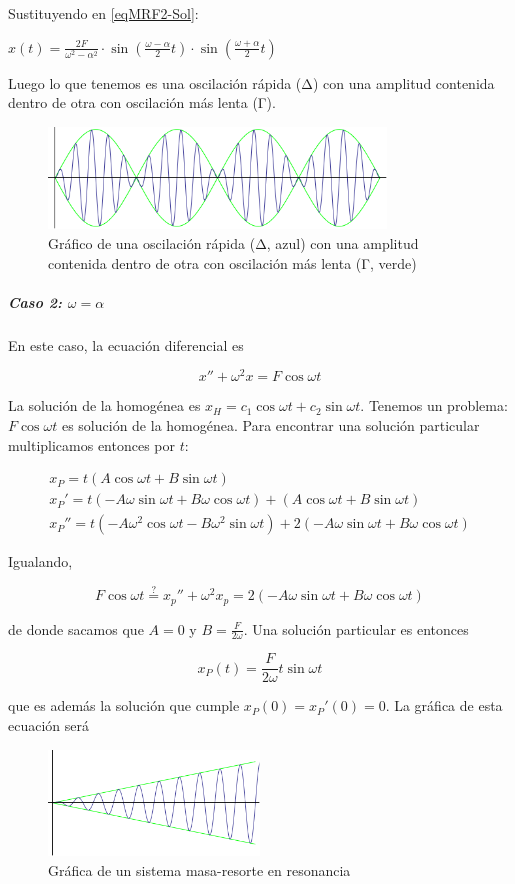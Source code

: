 Sustituyendo en \eqref{eqMRF2-Sol}:

\( x(t) = \frac{2F}{ω^2-α^2} ·\sin\left( \frac{ω-α}{2}t\right) · \sin\left( \frac{ω+α}{2}t\right)  \)

Luego lo que tenemos es una oscilación rápida (Δ) con una amplitud contenida dentro de otra con oscilación más lenta (Γ).

\begin{figure}
\centering
\includegraphics[width=0.8\textwidth]{img/MasaResorteF.png}
\caption{Gráfico de una oscilación rápida (Δ, azul) con una amplitud contenida dentro de otra con oscilación más lenta (Γ, verde)}
\label{imgMasaResorteF}
\end{figure}

\subparagraph{Caso 2: $ω=α$}

En este caso, la ecuación diferencial es

\[ x'' + ω^2 x = F\cos ωt \]

La solución de la homogénea es $x_H = c_1 \cos ωt + c_2 \sin ωt$. Tenemos un problema: $F\cos ωt$ es solución de la homogénea. Para encontrar una solución particular multiplicamos entonces por $t$:

\begin{gather*}
x_P = t\left(A\cos ωt + B\sin ωt\right) \\
x_P' =t\left(-Aω\sin ωt + Bω\cos ωt\right) + \left(A\cos ωt + B\sin ωt\right) \\
x_P'' = t\left(-Aω^2 \cos ωt - Bω^2 \sin ωt\right) + 2\left(-Aω\sin ωt + Bω\cos ωt \right)
\end{gather*}

Igualando,

\[ F\cos ωt \stackrel{?}{=} x_p'' + ω^2x_p = 2\left(-Aω\sin ωt + Bω\cos ωt \right) \]

de donde sacamos que $A=0$ y $B=\frac{F}{2ω}$. Una solución particular es entonces

\[ x_P(t) = \frac{F}{2ω}t \sin ωt \]

que es además la solución que cumple $x_P(0) = x_P'(0) = 0$. La gráfica de esta ecuación será

\begin{figure}[hbtp]
\centering
\includegraphics[width=0.5\textwidth]{img/MasaResorteF-Resonancia.png}
\caption{Gráfica de un sistema masa-resorte en resonancia}
\label{imgMasaResorteFR}
\end{figure}

